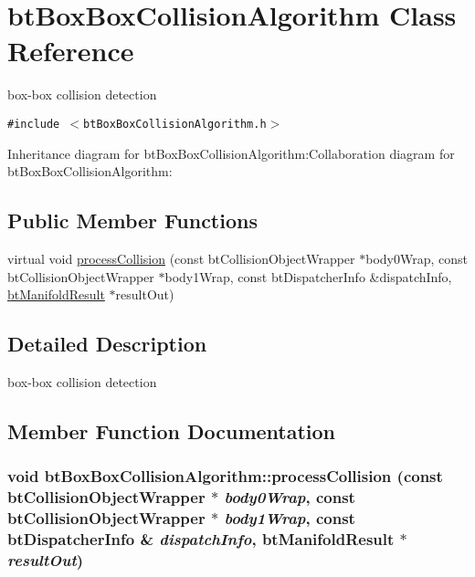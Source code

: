 \hypertarget{classbt_box_box_collision_algorithm}{
\section{btBoxBoxCollisionAlgorithm Class Reference}
\label{classbt_box_box_collision_algorithm}
}
box-box collision detection  


{\tt \#include $<$btBoxBoxCollisionAlgorithm.h$>$}

Inheritance diagram for btBoxBoxCollisionAlgorithm:Collaboration diagram for btBoxBoxCollisionAlgorithm:\subsection*{Public Member Functions}
\begin{CompactItemize}
\item 
virtual void \hyperlink{classbt_box_box_collision_algorithm_adde989098617a7679a8d907f4144adb}{processCollision} (const btCollisionObjectWrapper $\ast$body0Wrap, const btCollisionObjectWrapper $\ast$body1Wrap, const btDispatcherInfo \&dispatchInfo, \hyperlink{classbt_manifold_result}{btManifoldResult} $\ast$resultOut)
\end{CompactItemize}


\subsection{Detailed Description}
box-box collision detection 

\subsection{Member Function Documentation}
\hypertarget{classbt_box_box_collision_algorithm_adde989098617a7679a8d907f4144adb}{
\subsubsection[processCollision]{\setlength{\rightskip}{0pt plus 5cm}void btBoxBoxCollisionAlgorithm::processCollision (const btCollisionObjectWrapper $\ast$ {\em body0Wrap}, \/  const btCollisionObjectWrapper $\ast$ {\em body1Wrap}, \/  const btDispatcherInfo \& {\em dispatchInfo}, \/  {\bf btManifoldResult} $\ast$ {\em resultOut})}}
\label{classbt_box_box_collision_algorithm_adde989098617a7679a8d907f4144adb}




